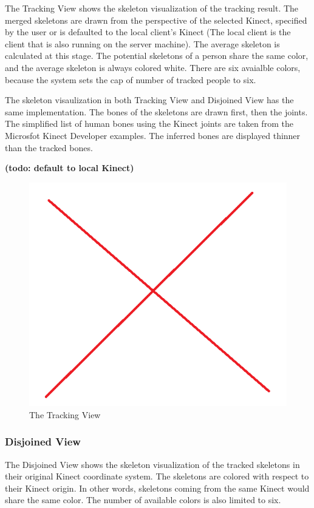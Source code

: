 \documentclass{sigchi}
\begin{document}
The Tracking View shows the skeleton visualization of the tracking result. The merged skeletons are drawn from the perspective of the selected Kinect, specified by the user or is defaulted to the local client's Kinect (The local client is the client that is also running on the server machine). The average skeleton is calculated at this stage. The potential skeletons of a person share the same color, and the average skeleton is always colored white. There are six avaialble colors, because the system sets the cap of number of tracked people to six.

The skeleton visaulization in both Tracking View and Disjoined View has the same implementation. The bones of the skeletons are drawn first, then the joints. The simplified list of human bones using the Kinect joints are taken from the Microsfot Kinect Developer examples. The inferred bones are displayed thinner than the tracked bones.

\textbf{(todo: default to local Kinect)}

\begin{figure}[!h]
  \centering
  \includegraphics[width=0.9\columnwidth]{tracking_view}
  \caption{The Tracking View}
  \label{fig:tracking_view}
\end{figure}

\subsubsection{Disjoined View}
\label{subsec:disjoined_view}

The Disjoined View shows the skeleton visualization of the tracked skeletons in their original Kinect coordinate system. The skeletons are colored with respect to their Kinect origin. In other words, skeletons coming from the same Kinect would share the same color. The number of available colors is also limited to six.
\end{document}
